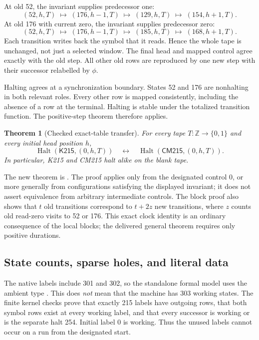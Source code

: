 \documentclass[11pt]{article}
\newtheorem{theorem}{Theorem}[section]
\newcommand{\Halt}{\operatorname{Halt}}
\newcommand{\K}{\mathsf{K215}}
\newcommand{\CM}{\mathsf{CM215}}
\newcommand{\code}[1]{\texttt{\detokenize{#1}}}
\begin{document}
At old 52, the invariant supplies predecessor one:
\[
 (52,h,T)\;\longmapsto\;(176,h-1,T)
 \;\longmapsto\;(129,h,T)
 \;\longmapsto\;(154,h+1,T).
\]
At old 176 with current zero, the invariant supplies predecessor zero:
\[
 (52,h,T)\;\longmapsto\;(176,h-1,T)
 \;\longmapsto\;(185,h,T)
 \;\longmapsto\;(168,h+1,T).
\]
Each transition writes back the symbol that it reads. Hence the whole tape is unchanged, not just a selected window. The final head and mapped control agree exactly with the old step. All other old rows are reproduced by one new step with their successor relabelled by $\phi$.

Halting agrees at a synchronization boundary. States 52 and 176 are nonhalting in both relevant roles. Every other row is mapped consistently, including the absence of a row at the terminal. Halting is stable under the totalized transition function. The positive-step theorem therefore applies.

\begin{theorem}[Checked exact-table transfer]
For every tape $T:\mathbb Z\to\{0,1\}$ and every initial head position $h$,
\[
 \Halt(\K,(0,h,T))\quad\longleftrightarrow\quad
 \Halt(\CM,(0,h,T)).
\]
In particular, K215 and CM215 halt alike on the blank tape.
\end{theorem}

The new theorem is \code{CM215Exact.all_tapes_equihalt}. The proof applies only from the designated control 0, or more generally from configurations satisfying the displayed invariant; it does not assert equivalence from arbitrary intermediate controls. The block proof also shows that $t$ old transitions correspond to $t+2z$ new transitions, where $z$ counts old read-zero visits to 52 or 176. This exact clock identity is an ordinary consequence of the local blocks; the delivered general theorem requires only positive durations.

\subsection{State counts, sparse holes, and literal data}

The native labels include 301 and 302, so the standalone formal model uses the ambient type \code{Fin 303}. This does \emph{not} mean that the machine has 303 working states. The finite kernel checks prove that exactly 215 labels have outgoing rows, that both symbol rows exist at every working label, and that every successor is working or is the separate halt 254. Initial label 0 is working. Thus the unused labels cannot occur on a run from the designated start.
\end{document}
